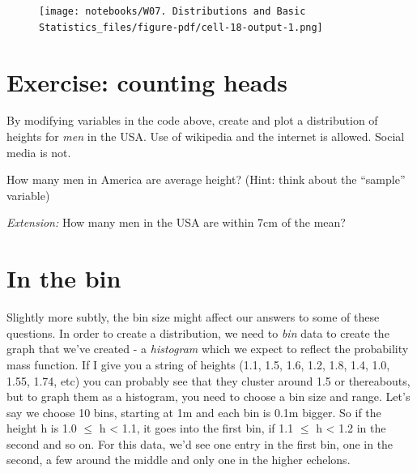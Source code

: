 \documentclass[
  letterpaper,
  DIV=11,
  numbers=noendperiod]{scrreprt}
\newenvironment{Shaded}{\begin{snugshade}}{\end{snugshade}}
\newcommand{\DecValTok}[1]{\textcolor[rgb]{0.68,0.00,0.00}{#1}}
\newcommand{\NormalTok}[1]{\textcolor[rgb]{0.00,0.23,0.31}{#1}}
\newcommand{\OperatorTok}[1]{\textcolor[rgb]{0.37,0.37,0.37}{#1}}
\newcommand{\StringTok}[1]{\textcolor[rgb]{0.13,0.47,0.30}{#1}}
\begin{document}
\begin{Shaded}
\end{Shaded}

\begin{figure}[H]

{\centering \texttt{[image: notebooks/W07. Distributions and Basic Statistics\_files/figure-pdf/cell-18-output-1.png]}

}

\end{figure}


\hypertarget{exercise-counting-heads}{%
\chapter{Exercise: counting heads}\label{exercise-counting-heads}}

By modifying variables in the code above, create and plot a distribution
of heights for \emph{men} in the USA. Use of wikipedia and the internet
is allowed. Social media is not.

How many men in America are average height? (Hint: think about the
``sample'' variable)

\emph{Extension:} How many men in the USA are within 7cm of the mean?


\hypertarget{in-the-bin}{%
\chapter{In the bin}\label{in-the-bin}}

Slightly more subtly, the bin size might affect our answers to some of
these questions. In order to create a distribution, we need to
\emph{bin} data to create the graph that we've created - a
\emph{histogram} which we expect to reflect the probability mass
function. If I give you a string of heights (1.1, 1.5, 1.6, 1.2, 1.8,
1.4, 1.0, 1.55, 1.74, etc) you can probably see that they cluster around
1.5 or thereabouts, but to graph them as a histogram, you need to choose
a bin size and range. Let's say we choose 10 bins, starting at 1m and
each bin is 0.1m bigger. So if the height h is 1.0 \(\leq\) h
\textless{} 1.1, it goes into the first bin, if 1.1 \(\leq\) h
\textless{} 1.2 in the second and so on. For this data, we'd see one
entry in the first bin, one in the second, a few around the middle and
only one in the higher echelons.
\end{document}
